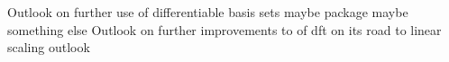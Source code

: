 Outlook on further use of differentiable basis sets maybe package maybe something else 
Outlook on further improvements to of dft on its road to linear scaling 
outlook 